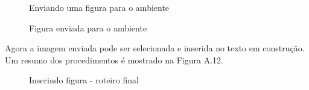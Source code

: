 
\begin{figure}
 \begin{center}
  \caption{Enviando uma figura para o ambiente}
 \end{center}
\end{figure}

\begin{figure}
 \begin{center}
  \caption{Figura enviada para o ambiente}
 \end{center}
\end{figure}

Agora a imagem enviada pode ser selecionada e inserida no texto em construção. Um resumo dos procedimentos é mostrado na Figura A.12.

\begin{figure}
 \begin{center}
  \caption{Inserindo figura - roteiro final}
 \end{center}
\end{figure}

